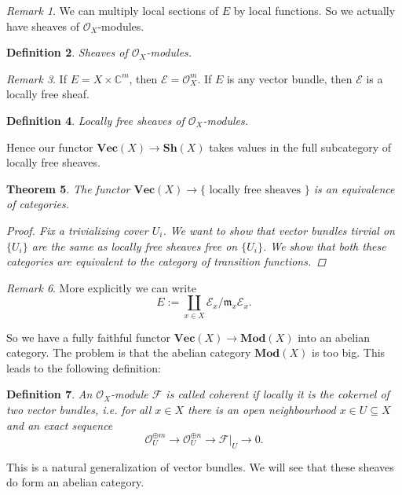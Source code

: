 \documentclass[12pt]{article}
\theoremstyle{darkgreentheorem}
\newtheorem{thm}{Theorem}[section]
\theoremstyle{darkbluedefinition}
\newtheorem{defn}[thm]{Definition}
\theoremstyle{darkredexample}
\theoremstyle{remark}
\newtheorem{rem}[thm]{Remark}
\newcommand{\1}{\mathbbm{1}}
\newcommand{\C}{\mathbb{C}}
\renewcommand{\Vec}{\mathbf{Vec}}
\newcommand{\Mod}{\mathbf{Mod}}
\newcommand{\Sh}{\mathbf{Sh}}
\newcommand{\F}{\mathcal{F}}
\newcommand{\E}{\mathcal{E}}
\renewcommand{\O}{\mathcal{O}}
\newcommand{\m}{\mathfrak{m}}
\newcommand{\op}{\oplus}
\newcommand{\sub}{\subseteq}
\begin{document}
\begin{rem}
    We can multiply local sections of $E$ by local functions.
    So we actually have sheaves of $\O_{X}$-modules.
\end{rem}

\begin{defn}
    Sheaves of $\O_{X}$-modules.
\end{defn}

\begin{rem}
    If $E=X\times \C^{m}$, then $\E=\O_{X}^{m}$.
    If $E$ is any vector bundle, then $\E$ is a locally free sheaf.
\end{rem}

\begin{defn}
    Locally free sheaves of $\O_{X}$-modules.
\end{defn}

Hence our functor $\Vec(X)\to \Sh(X)$ takes values in the full subcategory of locally free sheaves.

\begin{thm}
    The functor $\Vec(X)\to \{ \text{ locally free sheaves }\}$ is an equivalence of categories.
    \begin{proof}
	Fix a trivializing cover $U_{i}$.
	We want to show that vector bundles tirvial on $\{U_{i}\}$ are the same as locally free sheaves free on $\{U_{i}\}$.
	We show that both these categories are equivalent to the category of transition functions.
    \end{proof}
\end{thm}

\begin{rem}
    More explicitly we can write
    \[ E:=\coprod_{x\in X} \E_{x}/\m_{x}\E_{x}. \]
\end{rem}

So we have a fully faithful functor $\Vec(X)\to \Mod(X)$ into an abelian category.
The problem is that the abelian category $\Mod(X)$ is too big.
This leads to the following definition:

\begin{defn}
    An $\O_{X}$-module $\F$ is called \textit{coherent} if locally it is the cokernel of two vector bundles, i.e. for all $x\in X$ there is an open neighbourhood $x\in U\sub X$ and an exact sequence
    \[ \O_{U}^{\op m}\to \O_{U}^{\op n}\to \F|_{U}\to 0.\]
\end{defn}

This is a natural generalization of vector bundles.
We will see that these sheaves do form an abelian category.
\end{document}
